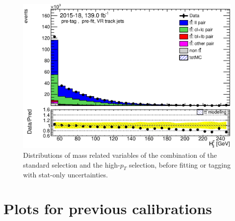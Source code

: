 \documentclass[letterpaper,12pt]{article}
\begin{document}
\begin{figure}[H]
\begin{minipage}[b]{.45\textwidth}
	\end{minipage}\hfill
	\begin{minipage}[b]{.45\textwidth}
	\centering
	\includegraphics[width=1\textwidth]{Oct_distributions/pretagNoRwDL1rwithhighpTVRJets_scaledall/DataMC_Htjj.eps}
	\end{minipage}
	\caption{Distributions of mass related variables of the combination 
	of the standard selection and the high-$p_T$ selection, 
	before fitting or tagging with stat-only uncertainties.} \label{fig:mass_VRJets}
	\end{figure}
	


\section{Plots for previous calibrations}
\end{document}
